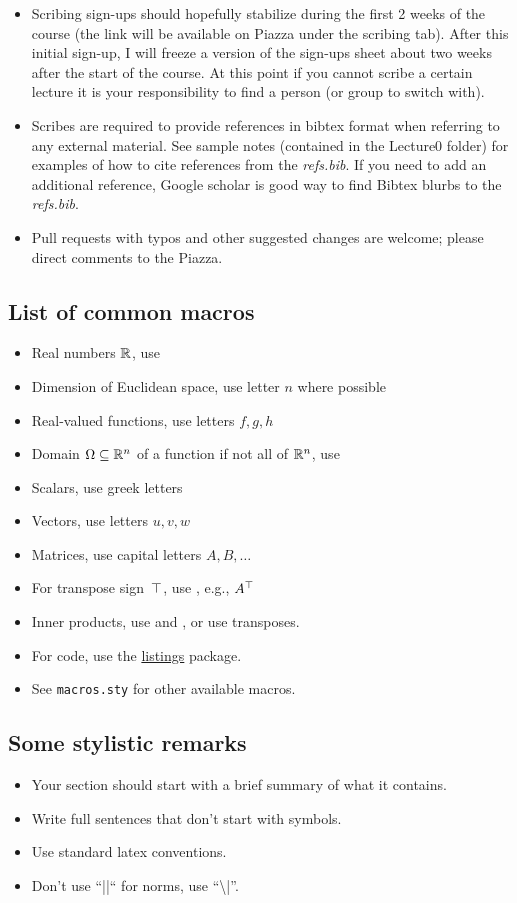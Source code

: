\documentclass[12pt]{article}
\begin{document}
\begin{itemize}
\item Scribing sign-ups should hopefully stabilize during the first 2 weeks of the course (the link will be available on Piazza under the scribing tab). After this initial sign-up, I will freeze a version of the sign-ups sheet about two weeks after the start of the course. At this point if you cannot scribe a certain lecture it is your responsibility to find a person (or group to switch with).
\item Scribes are required to provide references in bibtex format when referring to any external material. See sample notes (contained in the Lecture0 folder) for examples of how to cite references from the \emph{refs.bib}. If you need to add an additional reference, Google scholar is good way to find Bibtex blurbs to the \emph{refs.bib}.
\item Pull requests with typos and other suggested changes are welcome; please direct comments to the Piazza.
\end{itemize}


\subsection*{List of common macros}

\begin{itemize}
\item Real numbers $\mathbb{R}$, use 
\item Dimension of Euclidean space, use letter $n$ where possible
\item Real-valued functions, use letters $f, g, h$
\item Domain $\Omega\subseteq\mathbb{R}^n$ of a function if not all of $\mathbb{R}^n$, use 
\item Scalars, use greek letters
\item Vectors, use letters $u, v, w$
\item Matrices, use capital letters $A, B, \dots$
\item For transpose sign~$\top$, use , e.g., $A^\top$
\item Inner products, use  and , or use transposes.
\item For code, use the \href{https://en.wikibooks.org/wiki/LaTeX/Source_Code_Listings}{listings} package.
\item See {\tt macros.sty} for other available macros.
\end{itemize}

\subsection{Some stylistic remarks}

\begin{itemize}
\item Your section should start with a brief summary of what it contains.
\item Write full sentences that don't start with symbols.
\item Use standard latex conventions.
\item Don't use ``||`` for norms, use ``\textbackslash |''.
\end{itemize}
\end{document}
